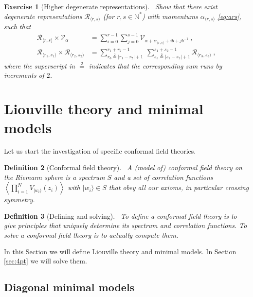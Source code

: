 \documentclass[12pt, a4paper]{article}
\theoremstyle{break}
\newtheorem{exo}{Exercise}[section]
\newtheorem{defn}[exo]{Definition}
\begin{document}
\begin{exo}[Higher degenerate representations]
~\label{exo:hdr}
 Show that there exist degenerate representations $\mathcal{R}_{\langle r,s \rangle}$ (for $r, s \in \mathbb{N}^*$) with momentums $\alpha_{\langle r,s \rangle}$ \eqref{eq:ars},
such that 
 \begin{align}
 \mathcal{R}_{\langle r,s \rangle}\times \mathcal{V}_\alpha &= \sum_{i=0}^{r-1} \sum_{j=0}^{s-1} \mathcal{V}_{\alpha + \alpha_{\langle r,s \rangle}+ ib+jb^{-1}}\ ,
\label{rtv}
 \\
 \mathcal{R}_{\langle r_1,s_1 \rangle} \times \mathcal{R}_{\langle r_2,s_2 \rangle} &= \sum_{r_3\overset{2}{=}|r_1-r_2|+1}^{r_1+r_2-1}\ \sum_{s_3\overset{2}{=}|s_1-s_2|+1}^{s_1+s_2-1} \mathcal{R}_{\langle r_3,s_3 \rangle}\ ,
\label{rrsr}
\end{align}
where the superscript in $\overset{2}{=}$ indicates that the corresponding sum runs by increments of $2$. 
\end{exo}


\section{Liouville theory and minimal models}

Let us start the investigation of specific conformal field theories. 

\begin{defn}[Conformal field theory]
~\label{def:cft}
A (model of) conformal field theory on the Riemann sphere is a spectrum $S$ and a set of correlation functions $\left<\prod_{i=1}^N V_{|w_i\rangle}(z_i)\right>$ with $|w_i\rangle\in S$ that obey all our axioms, in particular crossing symmetry. 
\end{defn}

\begin{defn}[Defining and solving]
 ~\label{def:def}
 To define a conformal field theory is to give principles that uniquely determine its spectrum and correlation functions.
 To solve a conformal field theory is to actually compute them.
\end{defn}

In this Section we will define Liouville theory and minimal models. In Section \ref{sec:4pt} we will solve them.


\subsection{Diagonal minimal models}
\end{document}
